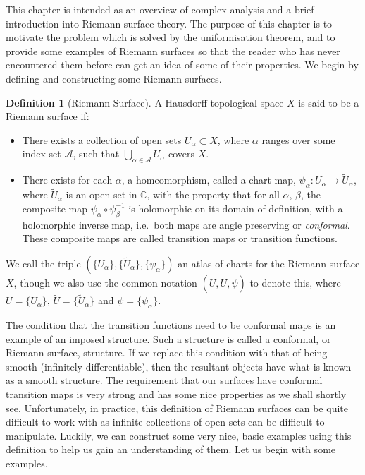 \documentclass[11pt]{report}
\theoremstyle{definition}
\newtheorem{defn}[thm]{Definition}
\begin{document}
This chapter is intended as an overview of complex analysis and a brief introduction into Riemann surface theory. The purpose of this chapter is to motivate the problem which is solved by the uniformisation theorem, and to provide some examples of Riemann surfaces so that the reader who has never encountered them before can get an idea of some of their properties. We begin by defining and constructing some Riemann surfaces. 

\begin{defn}[Riemann Surface]\label{rsdefn}
A Hausdorff topological space $X$ is said to be a Riemann surface if:
\begin{itemize}
\item There exists a collection of open sets $U_{\alpha} \subset X$, where
  $\alpha$ ranges over some index set $\mathcal{A}$, such that $\bigcup\limits_{\alpha \in \mathcal{A}} U_{\alpha}$ covers $X$.
\item There exists for each $\alpha$, a homeomorphism, called a chart map,
  $ \psi_{\alpha}\colon U_{\alpha} \rightarrow \widetilde{U}_{\alpha}$, where $\widetilde{U}_{\alpha}$ is 
  an open set in $\mathbb{C}$, with the property that for all $\alpha$,
  $\beta$, the composite map $\psi_{\alpha} \circ \psi_{\beta}^{-1}$ is
  holomorphic on its domain of definition, with a holomorphic inverse map, i.e.\ both maps are angle preserving or \emph{conformal}. These composite maps are called transition maps or transition functions.
\end{itemize}
We call the triple $(\{U_\alpha\},\{\widetilde{U}_{\alpha}\},
\{\psi_\alpha\})$ an atlas of charts for the Riemann surface $X$, though we also use the common
notation $(U,\widetilde{U}, \psi)$ to denote this, where $U=\{U_\alpha\}$, $\widetilde{U}=\{\widetilde{U} _{\alpha}\}$ and $\psi=\{\psi_\alpha\}$.
\end{defn}
The condition that the transition functions need to be conformal maps is an example of an imposed structure. Such a structure is called a conformal, or Riemann surface, structure. If we replace this condition with that of being smooth (infinitely differentiable), then the resultant objects have what is known as a smooth structure. The requirement that our surfaces have conformal transition maps is very strong and has some nice properties as we shall shortly see. Unfortunately, in practice, this definition of Riemann surfaces can be quite difficult to work with as infinite collections of open sets can be difficult to manipulate. Luckily, we can construct some very nice, basic examples using this definition to help us gain an understanding of them. Let us begin with some examples.
\end{document}
